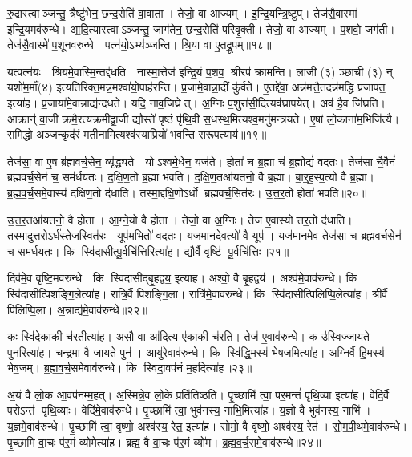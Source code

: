 रु॒द्रास्त्वाञ्जन्तु॒ त्रैष्टु॑भेन॒ छन्द॒सेति॑ वा॒वाता।
तेजो॒ वा आज्यम्।
इ॒न्द्रि॒यन्त्रि॒ष्टुप्।
तेज॑सै॒वास्मा॑ इन्द्रि॒यमव॑रुन्धे।
आ॒दि॒त्यास्त्वाऽञ्जन्तु॒ जाग॑तेन॒ छन्द॒सेति॑ परिवृ॒क्ती।
तेजो॒ वा आज्यम्।
प॒शवो॒ जग॑ती।
तेज॑सै॒वास्मे॑ प॒शूनव॑रुन्धे।
पत्न॑यो॒ऽभ्य॑ञ्जन्ति।
श्रि॒या वा ए॒तद्रू॒पम्॥१८॥

यत्पत्न॑यः।
श्रिय॑मे॒वास्मि॒न्तद्द॑धति।
नास्मा॒त्तेज॑ इन्द्रि॒यं प॒शव॒ श्रीरप॑ क्रामन्ति।
लाजी (३) ञ्छाची (३) न् यशो॑म॒माँ(४) इत्यति॑रिक्त॒मन्न॒मश्वा॑यो॒पाह॑रन्ति।
प्र॒जामे॒वान्ना॒दीं कु॑र्वते।
ए॒तद्दे॑वा॒ अन्न॑मत्तै॒तदन्न॑मद्धि प्रजापत॒ इत्या॑ह।
प्र॒जाया॑मे॒वान्नाद्य॑न्दधते।
यदि॒ नाव॒जिघ्रेत्।
अ॒ग्निः प॒शुरा॑सी॒दित्यव॑घ्रापयेत्।
अव॑ है॒व जि॑घ्रति।
आक्रान्॑ वा॒जी क्रमै॒रत्य॑क्रमीद्वा॒जी द्यौस्ते॑ पृ॒ष्ठं पृ॑थि॒वी स॒धस्थ॒मित्यश्व॒मनु॑मन्त्रयते।
ए॒षां लो॒काना॑म॒भिजि॑त्यै।
समि॑द्धो अ॒ञ्जन्कृद॑रं मती॒नामित्यश्व॑स्या॒प्रियो॑ भवन्ति सरूप॒त्याय॑॥१९॥\anuvakamend[परि॑त॒स्थुष॒ इत्या॑हे॒मे ए॒वास्मै॑ युनक्त्य॒भिजि॑त्यै भरन्त्यश्वमे॒धो रु॑न्धे रू॒पञ्जि॑घ्रति॒ त्रीणि॑ च]

तेज॑सा॒ वा ए॒ष ब्र॑ह्मवर्च॒सेन॒ व्यृ॑द्ध्यते।
योऽश्वमे॒धेन॒ यज॑ते।
होता॑ च ब्र॒ह्मा च॑ ब्र॒ह्मोद्यं॑ वदतः।
तेज॑सा चै॒वैनं॑ ब्रह्मवर्च॒सेन॑ च॒ सम॑र्धयतः।
द॒क्षि॒ण॒तो ब्र॒ह्मा भ॑वति।
द॒क्षि॒ण॒तआ॑यतनो॒ वै ब्र॒ह्मा।
बा॒र्॒ह॒स्प॒त्यो वै ब्र॒ह्मा।
ब्र॒ह्म॒व॒र्च॒समे॒वास्य॑ दक्षिण॒तो द॑धाति।
तस्मा॒द्दक्षि॒णोऽर्धो ब्रह्मवर्च॒सित॑रः।
उ॒त्त॒र॒तो होता॑ भवति॥२०॥

उ॒त्त॒र॒तआ॑यतनो॒ वै होता।
आ॒ग्ने॒यो वै होता।
तेजो॒ वा अ॒ग्निः।
तेज॑ ए॒वास्योत्तर॒तो द॑धाति।
तस्मा॒दुत्त॒रोऽर्ध॑स्तेज॒स्वित॑रः।
यूप॑म॒भितो॑ वदतः।
य॒ज॒मा॒न॒दे॒व॒त्यो॑ वै यूप॑।
यज॑मानमे॒व तेज॑सा च ब्रह्मवर्च॒सेन॑ च॒ सम॑र्धयतः।
कि स्वि॑दासीत्पू॒र्वचि॑त्ति॒रित्या॑ह।
द्यौर्वै वृष्टि॑ पू॒र्वचि॑त्तिः॥२१॥

दिव॑मे॒व वृष्टि॒मव॑रुन्धे।
कि स्वि॑दासीद्बृ॒हद्वय॒ इत्या॑ह।
अश्वो॒ वै बृ॒हद्वय॑।
अश्व॑मे॒वाव॑रुन्धे।
कि स्वि॑दासीत्पिशङ्गि॒लेत्या॑ह।
रात्रि॒र्वै पि॑शङ्गि॒ला।
रात्रि॑मे॒वाव॑रुन्धे।
कि स्वि॑दासीत्पिलिप्पि॒लेत्या॑ह।
श्रीर्वै पि॑लिप्पि॒ला।
अ॒न्नाद्य॑मे॒वाव॑रुन्धे॥२२॥

कः स्वि॑देका॒की च॑र॒तीत्या॑ह।
अ॒सौ वा आ॑दि॒त्य ए॑का॒की च॑रति।
तेज॑ ए॒वाव॑रुन्धे।
क उ॑स्विज्जायते॒ पुन॒रित्या॑ह।
च॒न्द्रमा॒ वै जा॑यते॒ पुन॑।
आयु॑रे॒वाव॑रुन्धे।
कि स्वि॑द्धि॒मस्य॑ भेष॒जमित्या॑ह।
अ॒ग्निर्वै हि॒मस्य॑ भेष॒जम्।
ब्र॒ह्म॒व॒र्च॒समेवाव॑रुन्धे।
कि स्वि॑दा॒वप॑नं म॒हदित्या॑ह॥२३॥

अ॒यं वै लो॒क आ॒वप॑नम्म॒हत्।
अ॒स्मिन्ने॒व लो॒के प्रति॑तिष्ठति।
पृ॒च्छामि॑ त्वा॒ पर॒मन्तं॑ पृथि॒व्या इत्या॑ह।
वेदि॒र्वै परोऽन्त॑ पृथि॒व्याः।
वेदि॑मे॒वाव॑रुन्धे।
पृ॒च्छामि॑ त्वा॒ भुव॑नस्य॒ नाभि॒मित्या॑ह।
य॒ज्ञो वै भुव॑नस्य॒ नाभि॑।
य॒ज्ञमे॒वाव॑रुन्धे।
पृ॒च्छामि॑ त्वा॒ वृष्णो॒ अश्व॑स्य॒ रेत॒ इत्या॑ह।
सोमो॒ वै वृष्णो॒ अश्व॑स्य॒ रेत॑।
सो॒म॒पी॒थमे॒वाव॑रुन्धे।
पृ॒च्छामि॑ वा॒चः प॑र॒मं व्यो॑मेत्या॑ह।
ब्रह्म॒ वै वा॒चः प॑र॒मं व्यो॑म।
ब्र॒ह्म॒व॒र्च॒समे॒वाव॑रुन्धे॥२४॥\anuvakamend[होता॑ भवति॒ वै वृष्टि॑ पू॒र्वचि॑त्तिर॒न्नाद्य॑मे॒वाव॑रुन्धे म॒हदित्या॑ह॒ सोमो॒ वै वृष्णो॒ अश्व॑स्य॒ रेत॑श्च॒त्वारि॑ च]

